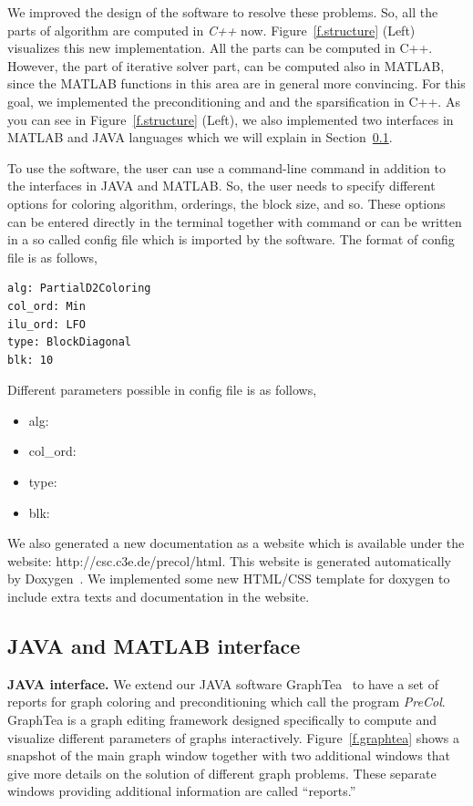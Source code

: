 \documentclass[12pt, oneside]{book}
\begin{document}
We improved the design of the software to resolve these problems.
So, all the parts of algorithm are computed in \textit{C++} now.
Figure~\ref{f.structure} (Left) visualizes this new implementation.
All the parts can be computed in C++. However, 
the part of iterative solver part, can be computed also in MATLAB,
since the MATLAB functions in this area are in general more convincing. 
For this goal, we implemented the preconditioning and 
and the sparsification in C++. 
As you can see in Figure~\ref{f.structure} (Left), we also implemented
two interfaces in MATLAB and JAVA languages which we will explain in 
Section~\ref{s.interfaces}.

To use the software, the user can use a command-line command in addition to
the interfaces in JAVA and MATLAB. So, the user needs to specify different
options for coloring algorithm, orderings, the block size, and so.
These options can be entered directly in the terminal together with command
or can be written in a so called config file which is imported by the software. 
The format of config file is as follows,
\begin{lstlisting}
alg: PartialD2Coloring
col_ord: Min
ilu_ord: LFO
type: BlockDiagonal
blk: 10
\end{lstlisting}
Different parameters possible in config file is as follows,
\begin{itemize}
\item alg:
\item col\_ord: 
\item type:
\item blk:
\end{itemize}

We also generated a new documentation as a website which is available
under the website: http://csc.c3e.de/precol/html.
This website is generated automatically by Doxygen~\cite{Lischner2013}.
We implemented some new HTML/CSS template for doxygen to include extra
texts and documentation in the website.

\subsection{JAVA and MATLAB interface}
\label{s.interfaces}
\textbf{JAVA interface.}
We extend our JAVA software GraphTea~
\cite{2014:07,2014:15,2014:16,2015:05,2015:06,2015:07,2015:08} to have a
set of reports for graph coloring and preconditioning which call the program
\textit{PreCol}.
GraphTea is a graph editing framework designed specifically to compute and visualize
different parameters of graphs interactively.
Figure~\ref{f.graphtea} shows a snapshot of the main
graph window together with two additional windows that give more details on the solution
of different graph problems. These separate windows providing additional information are
called ``reports.''
\end{document}
